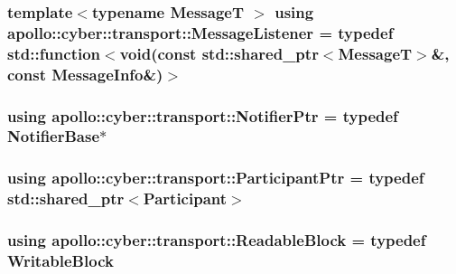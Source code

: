 \hypertarget{namespaceapollo_1_1cyber_1_1transport_aade3f4d41770972ae44166cdde27e2d8}{
\subsubsection[{Message\-Listener}]{\setlength{\rightskip}{0pt plus 5cm}template$<$typename Message\-T $>$ using {\bf apollo\-::cyber\-::transport\-::\-Message\-Listener} = typedef std\-::function$<$void(const std\-::shared\-\_\-ptr$<$Message\-T$>$\&, const {\bf Message\-Info}\&)$>$}}\label{namespaceapollo_1_1cyber_1_1transport_aade3f4d41770972ae44166cdde27e2d8}
\hypertarget{namespaceapollo_1_1cyber_1_1transport_ad7de1bbf34457c17c4d04b9bbfe152b4}{
\subsubsection[{Notifier\-Ptr}]{\setlength{\rightskip}{0pt plus 5cm}using {\bf apollo\-::cyber\-::transport\-::\-Notifier\-Ptr} = typedef {\bf Notifier\-Base}$\ast$}}\label{namespaceapollo_1_1cyber_1_1transport_ad7de1bbf34457c17c4d04b9bbfe152b4}
\hypertarget{namespaceapollo_1_1cyber_1_1transport_a4214d0780331276d0384d0b57e3bc688}{
\subsubsection[{Participant\-Ptr}]{\setlength{\rightskip}{0pt plus 5cm}using {\bf apollo\-::cyber\-::transport\-::\-Participant\-Ptr} = typedef std\-::shared\-\_\-ptr$<${\bf Participant}$>$}}\label{namespaceapollo_1_1cyber_1_1transport_a4214d0780331276d0384d0b57e3bc688}
\hypertarget{namespaceapollo_1_1cyber_1_1transport_a38f70b996ac896a1bc06d4598f1d0070}{
\subsubsection[{Readable\-Block}]{\setlength{\rightskip}{0pt plus 5cm}using {\bf apollo\-::cyber\-::transport\-::\-Readable\-Block} = typedef {\bf Writable\-Block}}}\label{namespaceapollo_1_1cyber_1_1transport_a38f70b996ac896a1bc06d4598f1d0070}
